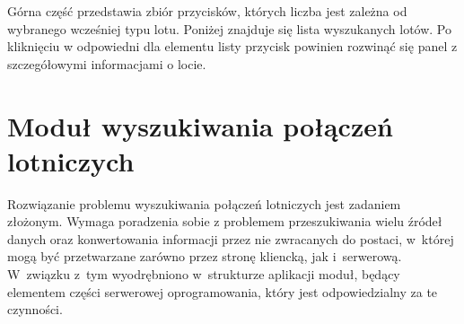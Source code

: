\documentclass[12pt, twoside]{report}
\begin{document}
\noindent Górna część przedstawia zbiór przycisków, których liczba jest zależna od wybranego wcześniej typu lotu. Poniżej znajduje się lista wyszukanych lotów. Po kliknięciu w odpowiedni dla elementu listy przycisk powinien rozwinąć się panel z szczegółowymi informacjami o locie.

\section{Moduł wyszukiwania połączeń lotniczych}
Rozwiązanie problemu wyszukiwania połączeń lotniczych jest zadaniem złożonym. Wymaga poradzenia sobie z problemem przeszukiwania wielu źródeł danych oraz konwertowania informacji przez nie zwracanych do postaci, w~której mogą być przetwarzane zarówno przez stronę kliencką, jak i~serwerową. W~związku z~tym wyodrębniono w~strukturze aplikacji moduł, będący elementem części serwerowej oprogramowania, który jest odpowiedzialny za te czynności.
\end{document}
